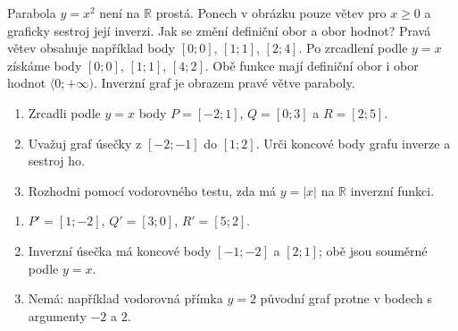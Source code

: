 \documentclass[11pt,a4paper]{article}
\begin{document}
\begin{prikladReseniBox}[title={Příklad 3}]
Parabola $y=x^2$ není na $\mathbb R$ prostá. Ponech v obrázku pouze větev pro $x\ge0$ a graficky sestroj její inverzi. Jak se změní definiční obor a obor hodnot?
\tcblower
Pravá větev obsahuje například body $[0;0]$, $[1;1]$, $[2;4]$. Po zrcadlení podle $y=x$ získáme body $[0;0]$, $[1;1]$, $[4;2]$. Obě funkce mají definiční obor i obor hodnot $\langle0;+\infty)$. Inverzní graf je obrazem pravé větve paraboly.
\end{prikladReseniBox}

\begin{center}
\end{center}

\clearpage
{}
\begin{zadaniReseniBox}[title={Samostatná práce 1}]
\begin{enumerate}[label=\alph*)]
\item Zrcadli podle $y=x$ body $P=[-2;1]$, $Q=[0;3]$ a $R=[2;5]$.
\item Uvažuj graf úsečky z $[-2;-1]$ do $[1;2]$. Urči koncové body grafu inverze a sestroj ho.
\item Rozhodni pomocí vodorovného testu, zda má $y=|x|$ na $\mathbb R$ inverzní funkci.
\end{enumerate}
\tcblower
\begin{enumerate}[label=\alph*)]
\item $P'=[1;-2]$, $Q'=[3;0]$, $R'=[5;2]$.
\item Inverzní úsečka má koncové body $[-1;-2]$ a $[2;1]$; obě jsou souměrné podle $y=x$.
\item Nemá: například vodorovná přímka $y=2$ původní graf protne v bodech s argumenty $-2$ a $2$.
\end{enumerate}
\end{zadaniReseniBox}
\end{document}
